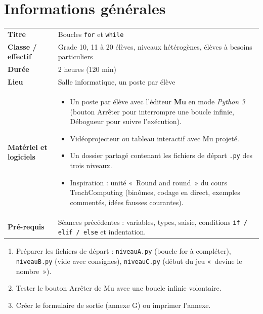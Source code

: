 \documentclass[11pt,a4paper]{article}
\begin{document}

\section{Informations générales}
\begin{tabularx}{\linewidth}{>{\bfseries}p{3.6cm}Y}
\toprule
Titre & Boucles \texttt{for} et \texttt{while}\\
Classe / effectif & Grade 10, 11 à 20 élèves, niveaux hétérogènes, élèves à besoins particuliers\\
Durée & 2 heures (120 min)\\
Lieu & Salle informatique, un poste par élève\\
Matériel et logiciels &
\begin{itemize}
 \item Un poste par élève avec l'éditeur \textbf{Mu} en mode \emph{Python 3} (bouton Arrêter pour interrompre une boucle infinie, Débogueur pour suivre l'exécution).
 \item Vidéoprojecteur ou tableau interactif avec Mu projeté.
 \item Un dossier partagé contenant les fichiers de départ \texttt{.py} des trois niveaux.
 \item Inspiration : unité «~Round and round~» du cours TeachComputing (binômes, codage en direct, exemples commentés, idées fausses courantes).
\end{itemize}\\
Pré-requis &
Séances précédentes : variables, types, saisie, conditions \texttt{if / elif / else} et indentation.\\
\bottomrule
\end{tabularx}

\begin{astuce}
\begin{enumerate}
 \item Préparer les fichiers de départ : \texttt{niveauA.py} (boucle for à compléter), \texttt{niveauB.py} (vide avec consignes), \texttt{niveauC.py} (début du jeu «~devine le nombre~»).
 \item Tester le bouton Arrêter de Mu avec une boucle infinie volontaire.
 \item Créer le formulaire de sortie (annexe G) ou imprimer l'annexe.
\end{enumerate}
\end{astuce}
\end{document}
